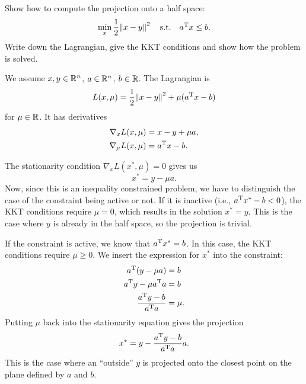 \documentclass{article}
\begin{document}
\begin{question}
  Show how to compute the projection onto a half space:
  \[
    \min_x \frac{1}{2} \enVert{x-y}^2 \quad \text{s.t.} \quad \T{a}x \leq b.
  \]
  Write down the Lagrangian, give the KKT conditions and show how the
  problem is solved.
\end{question}

We assume \(x, y \in \mathbb{R}^n\), \(a \in \mathbb{R}^n\), \(b \in \mathbb{R}\).  The Lagrangian is
\begin{equation*}
  L(x, \mu) = \frac{1}{2} \enVert{x-y}^2 + \mu(\T{a}x - b)
\end{equation*}
for \(\mu \in \mathbb{R}\).  It has derivatives
\begin{align*}
  \nabla_x L(x, \mu) &= x - y + \mu a, \\
  \nabla_\mu L(x, \mu) &= a^{\mathrm{T}} x - b.
\end{align*}

The stationarity condition \(\nabla_x L(x^*, \mu) = 0\) gives us
\begin{equation*}
  x^* = y - \mu a.
\end{equation*}
Now, since this is an inequality constrained problem, we have to distinguish the case of the
constraint being active or not.  If it is inactive (i.e., \(a^{\mathrm{T}}x^* - b < 0\)), the KKT conditions
require \(\mu = 0\), which results in the solution \(x^* = y\).  This is the case where \(y\) is
already in the half space, so the projection is trivial.

If the constraint is active, we know that \(a^{\mathrm{T}}x^* = b\).  In this case, the KKT conditions
require \(\mu \geq 0\).  We insert the expression for \(x^*\) into the constraint:
\begin{align*}
  a^{\mathrm{T}}(y - \mu a) &= b \\
  a^{\mathrm{T}} y - \mu a^{\mathrm{T}} a &= b \\
  \frac{a^{\mathrm{T}}y - b}{a^{\mathrm{T}} a} &= \mu.
\end{align*}
Putting \(\mu\) back into the stationarity equation gives the projection
\begin{equation*}
  x^* = y - \frac{a^{\mathrm{T}}y - b}{a^{\mathrm{T}} a} a.
\end{equation*}
This is the case where an ``outside'' \(y\) is projected onto the closest point on the plane defined by \(a\) and
\(b\).




\end{document}
